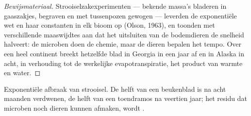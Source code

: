 \begin{proof}[Bewijsmateriaal]
Strooiselzakexperimenten --- bekende massa's bladeren in gaaszakjes,
begraven en met tussenpozen gewogen --- leverden de exponentiële wet en haar
constanten in elk bioom op (Olson, 1963), en toonden met verschillende
maaswijdtes aan dat het uitsluiten van de bodemdieren de snelheid halveert:
de microben doen de chemie, maar de dieren bepalen het tempo. Over een heel
continent breekt hetzelfde blad in Georgia in een jaar af en in Alaska in
acht, in verhouding tot de werkelijke evapotranspiratie, het product van
warmte en water.
\end{proof}

\begin{omfigure}

{\small Exponentiële afbraak van strooisel. De helft van een beukenblad is na
acht maanden verdwenen, de helft van een toendramos na veertien jaar; het
residu dat microben noch dieren kunnen afmaken, wordt .}
\end{omfigure}

